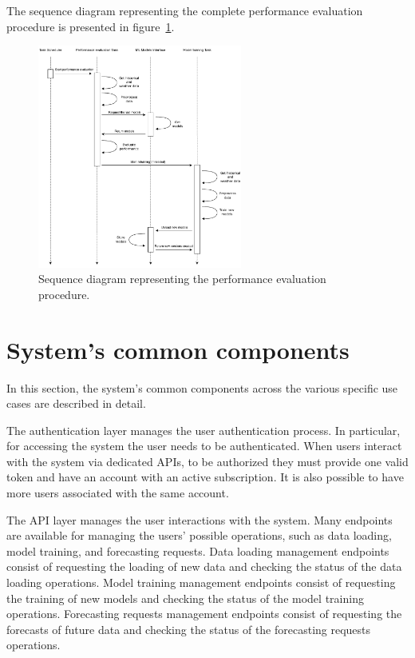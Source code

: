 The sequence diagram representing the complete performance evaluation procedure is presented in figure~\ref{fig:schedulersequence}.

\begin{figure}[H]
\centering
\includegraphics[width=0.6\textwidth]{images/architecture_scheduler_sequence}
\caption{Sequence diagram representing the performance evaluation procedure.}
\label{fig:schedulersequence}
\end{figure}


\section{System's common components}
\label{sec:components}
\vspace{0.2 cm}

In this section, the system's common components across the various specific use cases are described in detail.

The authentication layer manages the user authentication process.
In particular, for accessing the system the user needs to be authenticated.
When users interact with the system via dedicated APIs, to be authorized they must provide one valid token and have an account with an active subscription.
It is also possible to have more users associated with the same account.

The API layer manages the user interactions with the system.
Many endpoints are available for managing the users' possible operations, such as data loading, model training, and forecasting requests.
Data loading management endpoints consist of requesting the loading of new data and checking the status of the data loading operations.
Model training management endpoints consist of requesting the training of new models and checking the status of the model training operations.
Forecasting requests management endpoints consist of requesting the forecasts of future data and checking the status of the forecasting requests operations.

